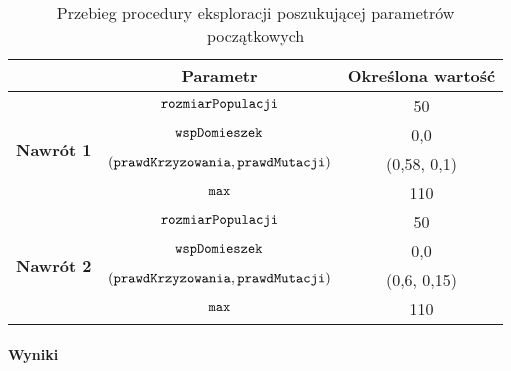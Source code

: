 \documentclass[./FM_mgr.tex]{subfiles}
\begin{document}

\begin{table}[H]
	\caption{Przebieg procedury eksploracji poszukującej parametrów początkowych \label{table:tsp_tweak_flow}}
	\centering
	\begin{tabular}{c|c|c|}
		\cline{2-3}
		& {\bf Parametr}                                     & {\bf Określona wartość} \\ \hline
		\multicolumn{1}{|c|}{\multirow{4}{*}{{\bf Nawrót 1}}} & $\mathtt{rozmiarPopulacji}$                         & 50                      \\ \cline{2-3} 
		\multicolumn{1}{|c|}{}                                & $\mathtt{wspDomieszek}$                             & 0,0                     \\ \cline{2-3} 
		\multicolumn{1}{|c|}{}                                & $(\mathtt{prawdKrzyzowania}, \mathtt{prawdMutacji})$ & (0,58, 0,1)             \\ \cline{2-3} 
		\multicolumn{1}{|c|}{}                                & $\mathtt{max}$                                      & 110                     \\ \hline \hline
		\multicolumn{1}{|c|}{\multirow{4}{*}{{\bf Nawrót 2}}} & $\mathtt{rozmiarPopulacji}$                         & 50                      \\ \cline{2-3} 
		\multicolumn{1}{|c|}{}                                & $\mathtt{wspDomieszek}$                             & 0,0                     \\ \cline{2-3} 
		\multicolumn{1}{|c|}{}                                & $(\mathtt{prawdKrzyzowania}, \mathtt{prawdMutacji})$ & (0,6, 0,15)             \\ \cline{2-3} 
		\multicolumn{1}{|c|}{}                                & $\mathtt{max}$                                      & 110                     \\ \hline
	\end{tabular}
\end{table}	

\paragraph{Wyniki}
\end{document}
